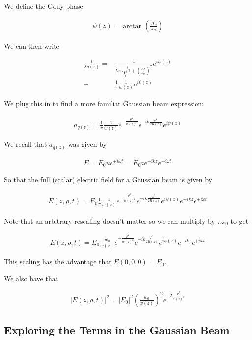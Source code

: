 \documentclass[12pt]{article}
\begin{document}
We define the Gouy phase

\begin{align}
\psi(z) = \arctan\left(\frac{\Delta z}{z_R}\right)
\end{align}

We can then write

\begin{align}
\frac{i}{\lambda q(z)} =& \frac{1}{\lambda z_R \sqrt{1+\left(\frac{\Delta z}{z_R}\right)^2}} e^{i\psi(z)}\\
=& \frac{1}{\pi} \frac{1}{w(z)} e^{i\psi(z)}
\end{align}

We plug this in to find a more familiar Gaussian beam expression:

\begin{align}
a_{q(z)} = \frac{1}{\pi} \frac{1}{w(z)}e^{-\frac{\rho^2}{w(z)^2}}e^{-ik\frac{\rho^2}{2R(z)}}e^{i\psi(z)}
\end{align}

We recall that $a_{q(z)}$ was given by

\begin{align}
E = E_0 u e^{+i\omega t} = E_0 a e^{-ikz}e^{+i\omega t}
\end{align}

So that the full (scalar) electric field for a Gaussian beam is given by

\begin{align}
E(z, \rho, t) = E_0 \frac{1}{\pi} \frac{1}{w(z)} e^{-\frac{\rho^2}{w(z)^2}}e^{-ik\frac{\rho^2}{2R(z)}}e^{i\psi(z)} e^{-ikz} e^{+i\omega t}
\end{align}

Note that an arbitrary rescaling doesn't matter so we can multiply by $\pi \omega_0$ to get

\begin{align}
E(z, \rho, t) = E_0 \frac{w_0}{w(z)} e^{-\frac{\rho^2}{w(z)^2}}e^{-ik\frac{\rho^2}{2R(z)}}e^{i\psi(z)} e^{-ikz} e^{+i\omega t}
\end{align}

This scaling has the advantage that $E(0, 0, 0) = E_0$.

We also have that

\begin{align}
|E(z, \rho, t)|^2 = |E_0|^2 \left(\frac{w_0}{w(z)}\right)^2 e^{-2 \frac{\rho^2}{w(z)^2}}
\end{align}

\subsection{Exploring the Terms in the Gaussian Beam}
\end{document}
